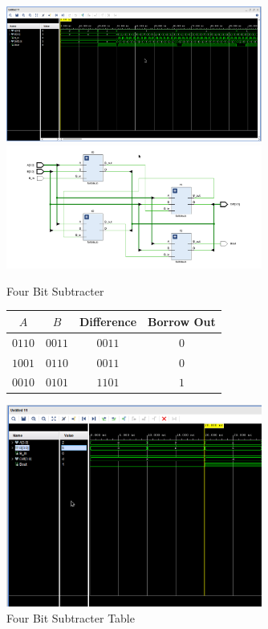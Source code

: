\documentclass[12pt letter]{report}
\begin{document}
\begin{figure}[H]
  \centering
  \includegraphics[width=0.75\textwidth]{fourbit_sig.png}
  \includegraphics[width=0.75\textwidth]{fourbit_sch.png}
  \caption{Four Bit Subtracter}
\end{figure}

\begin{figure}[H]
  \centering
  \begin{center}
    \begin{tabular}{|c c|c c|}
      \hline
      $A$    & $B$    & Difference & Borrow Out \\ [0.5ex]
      \hline
      \hline
      $0110$ & $0011$ & $0011$     & $0$        \\
      $1001$ & $0110$ & $0011$     & $0$        \\
      $0010$ & $0101$ & $1101$     & $1$        \\
      \hline
    \end{tabular}
  \end{center}
  \includegraphics[width=0.75\textwidth]{fourbit_ans.png}
  \caption{Four Bit Subtracter Table}
\end{figure}
\end{document}
